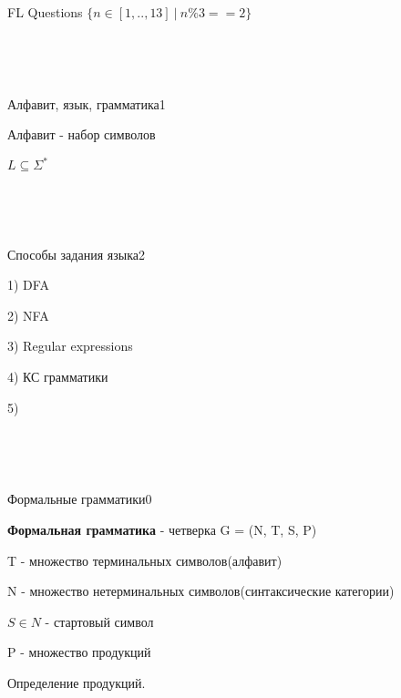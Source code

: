 \documentclass{article}
\begin{document}
\begin{center}

\Huge FL Questions $\{n \in [1, .. , 13] \: | \: n \% 3 == 2\}$

\end{center}

~\

~\

\begin{question}{Алфавит, язык, грамматика}{1}

Алфавит - набор символов

$L \subseteq \Sigma^*$



\end{question}

~\

~\


\begin{question}{Способы задания языка}{2}

1) DFA

2) NFA

3) Regular expressions

4) КС грамматики

5) 

\end{question}

~\

~\

\begin{question}{Формальные грамматики}{0}

\textbf{Формальная грамматика} - четверка G = (N, T, S, P)

T - множество терминальных символов(алфавит)

N - множество нетерминальных символов(синтаксические категории)

$S \in N$ - стартовый символ

P - множество продукций

Определение продукций.

\end{question}

~\

~\
\end{document}
